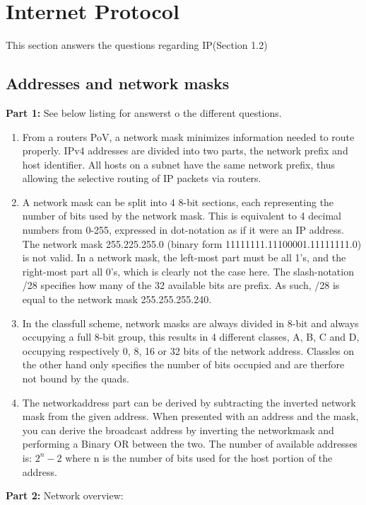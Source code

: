 \section{Internet Protocol}
This section answers the questions regarding IP(Section 1.2)

\subsection{Addresses and network masks}
\textbf{Part 1: } See below listing for answerst o the different questions.

\begin{enumerate}
\item From a routers PoV, a network mask minimizes information needed to route properly.
    IPv4 addresses are divided into two parts, the network prefix and host identifier.
    All hosts on a subnet have the same network prefix, thus allowing the selective routing
    of IP packets via routers.
\item A network mask can be split into 4 8-bit sections, each representing the
    number of bits used by the network mask. This is equivalent to 4 decimal
    numbers from 0-255, expressed in dot-notation as if it were an IP address.
    The network mask 255.225.255.0 (binary form 11111111.11100001.11111111.0)
    is not valid. In a network mask, the left-most part must be all 1's, and
    the right-most part all 0's, which is clearly not the case here. The 
    slash-notation /28 specifies how many of the 32 available bits are prefix.
    As such, /28 is equal to the network mask 255.255.255.240.
\item In the classfull scheme, network masks are always divided in 8-bit and
    always occupying a full 8-bit group, this results in 4 different classes, A, B,
    C and D, occupying respectively 0, 8, 16 or 32 bits of the network address.
    Classles on the other hand only specifies the number of bits occupied and are
    therfore not bound by the quads.
\item The networkaddress part can be derived by subtracting the inverted
    network mask from the given address. When presented with an address and the 
    mask, you can derive the broadcast address by inverting the networkmask and 
    performing a Binary OR between the two. 
    The number of available addresses is: $2^{n}-2$ where n is the number
    of bits used for the host portion of the address.
\end{enumerate}

\textbf{Part 2: } Network overview:

